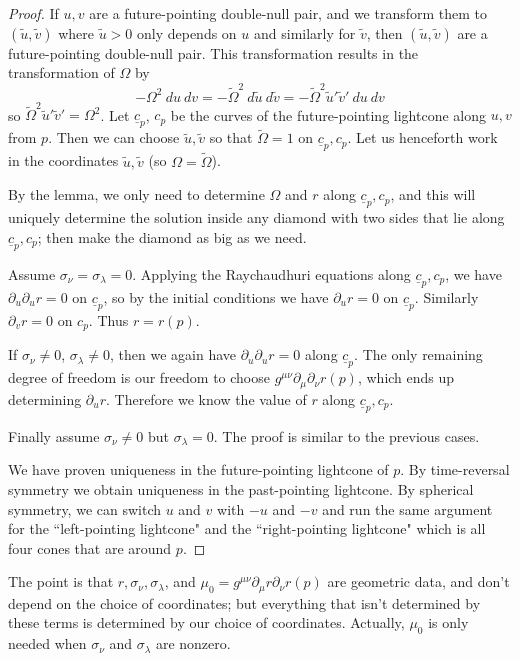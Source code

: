 \documentclass[12pt]{report}
\theoremstyle{definition}
\begin{document}
\begin{proof}
    If $u,v$ are a future-pointing double-null pair, and we transform them to $(\tilde u, \tilde v)$ where $\tilde u > 0$ only depends on $u$ and similarly for $\tilde v$, then $(\tilde u, \tilde v)$ are a future-pointing double-null pair. This transformation results in the transformation of $\Omega$ by
$$-\Omega^2 ~du~dv = -\tilde \Omega^2 ~d\tilde u ~d\tilde v = -\tilde \Omega^2 \tilde u' \tilde v' ~du ~dv$$
so $\tilde \Omega^2 \tilde u' \tilde v' = \Omega^2$.
    Let $\underline c_p$, $c_p$ be the curves of the future-pointing lightcone along $u, v$ from $p$. Then we can choose $\tilde u, \tilde v$ so that $\tilde \Omega = 1$ on $\underline c_p, c_p$. Let us henceforth work in the coordinates $\tilde u, \tilde v$ (so $\Omega = \tilde \Omega$).

    By the lemma, we only need to determine $\Omega$ and $r$ along $\underline c_p, c_p$, and this will uniquely determine the solution inside any diamond with two sides that lie along $\underline c_p, c_p$; then make the diamond as big as we need.

    Assume $\sigma_\nu = \sigma_\lambda = 0$. Applying the Raychaudhuri equations along $\underline c_p, c_p$, we have $\partial_u\partial_u r = 0$ on $\underline c_p$, so by the initial conditions we have $\partial_u r = 0$ on $\underline c_p$. Similarly $\partial_v r = 0$ on $c_p$. Thus $r = r(p)$.

    If $\sigma_\nu \neq 0$, $\sigma_\lambda \neq 0$, then we again have $\partial_u \partial_u r = 0$ along $\underline c_p$. The only remaining degree of freedom is our freedom to choose $g^{\mu\nu} \partial_\mu \partial_\nu r(p)$, which ends up determining $\partial_u r$. Therefore we know the value of $r$ along $\underline c_p, c_p$.

    Finally assume $\sigma_\nu \neq 0$ but $\sigma_\lambda = 0$. The proof is similar to the previous cases.

    We have proven uniqueness in the future-pointing lightcone of $p$. By time-reversal symmetry we obtain uniqueness in the past-pointing lightcone. By spherical symmetry, we can switch $u$ and $v$ with $-u$ and $-v$ and run the same argument for the ``left-pointing lightcone" and the ``right-pointing lightcone" which is all four cones that are around $p$.
\end{proof}
    The point is that $r,\sigma_\nu,\sigma_\lambda$, and $\mu_0 = g^{\mu\nu}\partial_\mu r \partial_\nu r(p)$ are geometric data, and don't depend on the choice of coordinates; but everything that isn't determined by these terms is determined by our choice of coordinates. Actually, $\mu_0$ is only needed when $\sigma_\nu$ and $\sigma_\lambda$ are nonzero.
\end{document}
